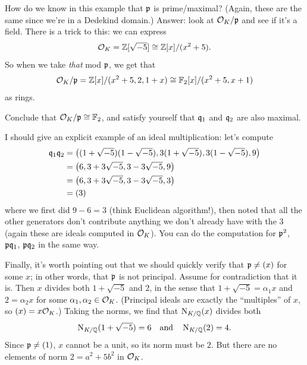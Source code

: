 How do we know in this example that $\mathfrak p$ is prime/maximal?
(Again, these are the same since we're in a Dedekind domain.)
Answer: look at $\mathcal O_K / \mathfrak p$ and see if it's a field.
There is a trick to this: we can express
\[ \mathcal O_K = \mathbb Z[\sqrt{-5}] \cong \mathbb Z[x] / (x^2+5). \]
So when we take \emph{that} mod $\mathfrak p$, we get that
\[ \mathcal O_K / \mathfrak p = \mathbb Z[x] / (x^2+5, 2, 1+x) \cong \mathbb F_2[x] / (x^2+5,x+1) \]
as rings.
\begin{ques}
	Conclude that $\mathcal O_K / \mathfrak p \cong \mathbb F_2$,
	and satisfy yourself that $\mathfrak q_1$ and $\mathfrak q_2$ are also maximal.
\end{ques}
I should give an explicit example of an ideal multiplication: let's compute
\begin{align*}
	\mathfrak q_1\mathfrak q_2 &= \left( (1+\sqrt{-5})(1-\sqrt{-5}), 3(1+\sqrt{-5}), 3(1-\sqrt{-5}), 9 \right) \\
	&= \left( 6, 3+3\sqrt{-5}, 3-3\sqrt{-5}, 9 \right) \\
	&= \left( 6, 3+3\sqrt{-5}, 3-3\sqrt{-5}, 3 \right) \\
	&= (3)
\end{align*}
where we first did $9-6=3$ (think Euclidean algorithm!),
then noted that all the other generators don't contribute
anything we don't already have with the $3$
(again these are ideals computed in $\mathcal O_K$).
You can do the computation for $\mathfrak p^2$, $\mathfrak p\mathfrak q_1$, $\mathfrak p\mathfrak q_2$ in the same way.

Finally, it's worth pointing out that we should quickly
verify that $\mathfrak p \neq (x)$ for some $x$;
in other words, that $\mathfrak p$ is not principal.
Assume for contradiction that it is.
Then $x$ divides both $1+\sqrt{-5}$ and $2$, in the sense
that $1+\sqrt{-5} = \alpha_1 x$ and $2 = \alpha_2 x$
for some $\alpha_1, \alpha_2 \in \mathcal O_K$.
(Principal ideals are exactly the ``multiples'' of $x$, so $(x) = x \mathcal O_K$.)
Taking the norms, we find that $\operatorname{N}_{K/\mathbb Q}(x)$ divides both
\[ \operatorname{N}_{K/\mathbb Q}(1+\sqrt{-5}) = 6 \quad\text{and}\quad \operatorname{N}_{K/\mathbb Q}(2) = 4. \]
Since $\mathfrak p \neq (1)$, $x$ cannot be a unit, so its norm must be $2$.
But there are no elements of norm $2 = a^2+5b^2$ in $\mathcal O_K$.

